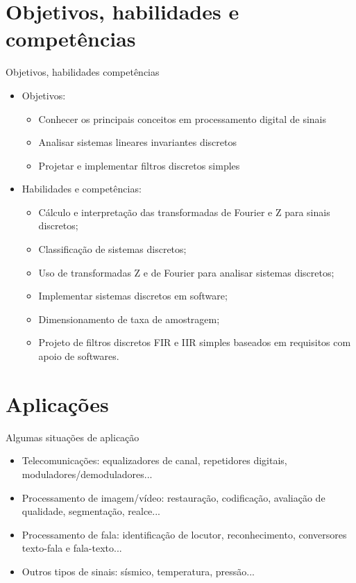    \section[slide=true]{Objetivos, habilidades e competências}
      \begin{slide}[toc=]{Objetivos, habilidades competências}
         \begin{itemize}
            \item Objetivos:
		    \begin{itemize}
			    \item Conhecer os principais conceitos em processamento digital de sinais
			    \item Analisar sistemas lineares invariantes discretos
			    \item Projetar e implementar filtros discretos simples
		    \end{itemize}
	     \item Habilidades e competências:
		     \begin{itemize}
			     \item Cálculo e interpretação das transformadas de Fourier e Z para sinais discretos;
			     \item Classificação de sistemas discretos;
			     \item Uso de transformadas Z e de Fourier para analisar sistemas discretos; 
			     \item Implementar sistemas discretos em software;
			     \item Dimensionamento de taxa de amostragem;
			     \item Projeto de filtros discretos FIR e IIR simples baseados em requisitos com apoio de softwares.
	            \end{itemize}
         \end{itemize}
      \end{slide}

   \section[slide=true]{Aplicações}
      \begin{slide}[toc=]{Algumas situações de aplicação}
         \begin{itemize}
            \item Telecomunicações: equalizadores de canal, repetidores digitais, moduladores/demoduladores...
            \item Processamento de imagem/vídeo: restauração, codificação, avaliação de qualidade, segmentação, realce...
            \item Processamento de fala: identificação de locutor, reconhecimento, conversores texto-fala e fala-texto...
            \item Outros tipos de sinais: sísmico, temperatura, pressão...
         \end{itemize}
      \end{slide}
  
